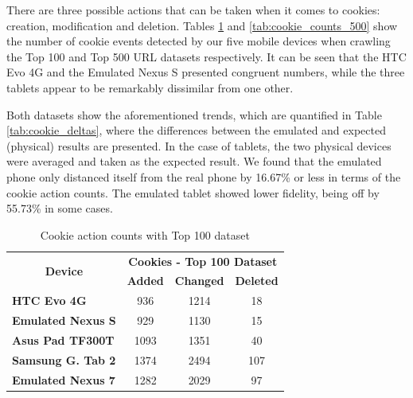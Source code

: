 \documentclass{acm_proc_article-sp}
\begin{document}
There are three possible actions that can be taken when it comes to cookies: creation, modification and deletion. Tables \ref{tab:cookie_counts_100} and \ref{tab:cookie_counts_500} show the number of cookie events detected by our five mobile devices when crawling the Top 100 and Top 500 URL datasets respectively. It can be seen that the HTC Evo 4G and the Emulated Nexus S presented congruent numbers, while the three tablets appear to be remarkably dissimilar from one other.

Both datasets show the aforementioned trends, which are quantified in Table \ref{tab:cookie_deltas}, where the differences between the emulated and expected (physical) results are presented. In the case of tablets, the two physical devices were averaged and taken as the expected result. We found that the emulated phone only distanced itself from the real phone by 16.67\% or less in terms of the cookie action counts. The emulated tablet showed lower fidelity, being off by 55.73\% in some cases.

\begin{table}[htbp]
  \centering
  \caption{Cookie action counts with Top 100 dataset}
    \begin{tabular}{|c|c|c|c|}
    \hline
    \multicolumn{1}{|c|}{\multirow{2}[4]{*}{\textbf{Device}}} & \multicolumn{3}{|c|}{\textbf{Cookies - Top 100 Dataset}} \\ \cline{2-4}
    \multicolumn{1}{|c|}{} & \multicolumn{1}{|c|}{\textbf{Added}} & \multicolumn{1}{|c|}{\textbf{Changed}} & \multicolumn{1}{|c|}{\textbf{Deleted}} \\ \hline
    \multicolumn{1}{|l|}{\textbf{HTC Evo 4G}} & 936   & 1214  & 18 \\
    \multicolumn{1}{|l|}{\textbf{Emulated Nexus S}} & 929   & 1130  & 15 \\
    \multicolumn{1}{|l|}{\textbf{Asus Pad TF300T}} & 1093  & 1351  & 40 \\
    \multicolumn{1}{|l|}{\textbf{Samsung G. Tab 2}} & 1374  & 2494  & 107 \\
    \multicolumn{1}{|l|}{\textbf{Emulated Nexus 7}} & 1282  & 2029  & 97 \\ \hline
    \end{tabular}%
  \label{tab:cookie_counts_100}%
\end{table}%
\end{document}
